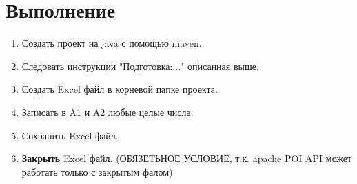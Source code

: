 \chapter{Выполнение}

\begin{enumerate}
	\item Создать проект на java с помощью maven.
	\item Следовать инструкции "Подготовка:..." описанная выше.
	
	\item Создать Excel файл в корневой папке проекта.
	
	\item Записать в A1 и A2 любые целые числа.
	
	\item Сохранить Excel файл.
	
	\item \textbf{Закрыть} Excel файл. (ОБЯЗЕТЬНОЕ УСЛОВИЕ, т.к. apache POI API может работать только с закрытым фалом)
	

\end{enumerate}
